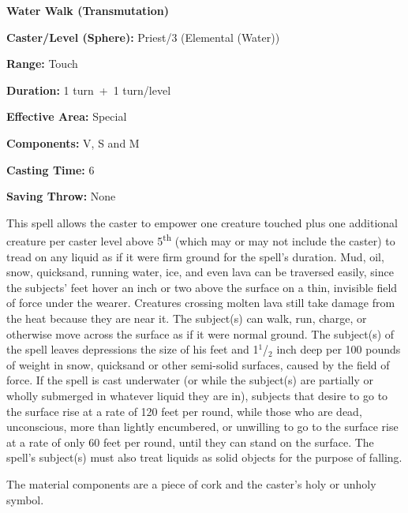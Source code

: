 \begin{multicols}{2}
\vspace{1em}

\noindent
\begin{minipage}{\columnwidth}

\noindent \textbf{Water Walk (Transmutation)}

\noindent \textbf{Caster/Level (Sphere):} Priest/3 (Elemental (Water))

\noindent \textbf{Range:} Touch

\noindent \textbf{Duration:} 1 turn~+~1 turn/level

\noindent \textbf{Effective Area:} Special

\noindent \textbf{Components:} V, S and M

\noindent \textbf{Casting Time:} 6

\noindent \textbf{Saving Throw:} None

\end{minipage}

This spell allows the caster to empower one creature touched plus one additional creature per caster level above 5\textsuperscript{th} (which may or may not include the caster) to tread on any liquid as if it were firm ground for the spell's duration.  Mud, oil, snow, quicksand, running water, ice, and even lava can be traversed easily, since the subjects' feet hover an inch or two above the surface on a thin, invisible field of force under the wearer.  Creatures crossing molten lava still take damage from the heat because they are near it.  The subject(s) can walk, run, charge, or otherwise move across the surface as if it were normal ground.  The subject(s) of the spell leaves depressions the size of his feet and 1$^1$/$_2$ inch deep per 100 pounds of weight in snow, quicksand or other semi-solid surfaces, caused by the field of force.  If the spell is cast underwater (or while the subject(s) are partially or wholly submerged in whatever liquid they are in), subjects that desire to go to the surface rise at a rate of 120 feet per round, while those who are dead, unconscious, more than lightly encumbered, or unwilling to go to the surface rise at a rate of only 60 feet per round, until they can stand on the surface.  The spell's subject(s) must also treat liquids as solid objects for the purpose of falling.  

The material components are a piece of cork and the caster's holy or unholy symbol.

\vspace{1em}

\noindent
\begin{minipage}{\columnwidth}


\end{minipage}
\end{multicols}
